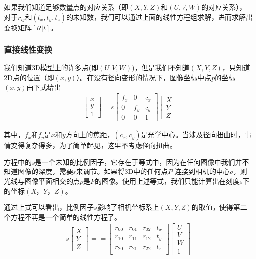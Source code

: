 如果我们知道足够数量点的对应关系（即$(X,Y,Z)$和$(U,V,W)$的对应关系），对于$r_{ij}$和$(t_x,t_y,t_z)$的未知数，我们可以通过上面的线性方程组求解，进而求解出变换矩阵$[R|t]$。\\

\subsubsection{直接线性变换}

我们知道3D模型上的许多点(即$(U,V,W)$)，但是我们不知道$(X,Y,Z)$，只知道2D点的位置（即$(x,y)$）。在没有径向变形的情况下，图像坐标中点$p$的坐标$(x,y)$由下式给出
\begin{align}
& \begin{bmatrix}
x \\ y \\ 1
\end{bmatrix}
= s \begin{bmatrix}
f_x & 0 & c_x \\ 0 & f_y & c_y \\0 & 0 & 1
\end{bmatrix}
\begin{bmatrix}
X \\ Y \\ Z
\end{bmatrix}
\end{align}

其中，$f_x$和$f_y$是$x$和$y$方向上的焦距，$(c_x,c_y)$是光学中心。当涉及径向扭曲时，事情变得复杂得多，为了简单起见，这里不考虑径向扭曲。

方程中的$s$是一个未知的比例因子，它存在于等式中，因为在任何图像中我们并不知道图像的深度，需要$s$来调节。如果将3D中的任何点$P$ 连接到相机的中心$o$，则光线与图像平面相交的点$p$是$P$的图像。使用上述等式，我们只能计算出在刻度s下的坐标$(X，Y，Z)$。

通过上式可以看出，比例因子$s$影响了相机坐标系上$(X,Y,Z)$的取值，使得第二个方程不再是一个简单的线性方程了。
\begin{align}
s\begin{bmatrix}
X \\ Y \\ Z
\end{bmatrix}
= = \begin{bmatrix}
r_{00} & r_{01} & r_{02} & t_x\\
r_{10} & r_{11} & r_{12} & t_y\\
r_{20} & r_{21} & r_{22} & t_z\\
\end{bmatrix}
\begin{bmatrix}
U\\ V \\ W \\ 1
\end{bmatrix}
\end{align}

